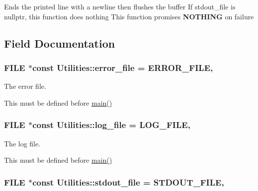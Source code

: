 Ends the printed line with a newline then flushes the buffer If stdout\+\_\+file is nullptr, this function does nothing This function promises {\bfseries N\+O\+T\+H\+I\+NG} on failure 

\subsection{Field Documentation}
\subsubsection[{\texorpdfstring{error\+\_\+file}{error_file}}]{\setlength{\rightskip}{0pt plus 5cm}F\+I\+LE $\ast$const Utilities\+::error\+\_\+file = {\bf E\+R\+R\+O\+R\+\_\+\+F\+I\+LE}\hspace{0.3cm}{\ttfamily [static]}, {\ttfamily [private]}}\hypertarget{class_utilities_afc3b1cf892b76cede8fa87bfdd17533c}{}\label{class_utilities_afc3b1cf892b76cede8fa87bfdd17533c}


The error file. 

This must be defined before \hyperlink{shadow__stack_8cpp_a0ddf1224851353fc92bfbff6f499fa97}{main()} 
\subsubsection[{\texorpdfstring{log\+\_\+file}{log_file}}]{\setlength{\rightskip}{0pt plus 5cm}F\+I\+LE $\ast$const Utilities\+::log\+\_\+file = {\bf L\+O\+G\+\_\+\+F\+I\+LE}\hspace{0.3cm}{\ttfamily [static]}, {\ttfamily [private]}}\hypertarget{class_utilities_ab6252fb13f3e69ee6108879fc3125bff}{}\label{class_utilities_ab6252fb13f3e69ee6108879fc3125bff}


The log file. 

This must be defined before \hyperlink{shadow__stack_8cpp_a0ddf1224851353fc92bfbff6f499fa97}{main()} 
\subsubsection[{\texorpdfstring{stdout\+\_\+file}{stdout_file}}]{\setlength{\rightskip}{0pt plus 5cm}F\+I\+LE $\ast$const Utilities\+::stdout\+\_\+file = {\bf S\+T\+D\+O\+U\+T\+\_\+\+F\+I\+LE}\hspace{0.3cm}{\ttfamily [static]}, {\ttfamily [private]}}\hypertarget{class_utilities_a224eea0a234ac9877a8334f74fc89ef0}{}\label{class_utilities_a224eea0a234ac9877a8334f74fc89ef0}


